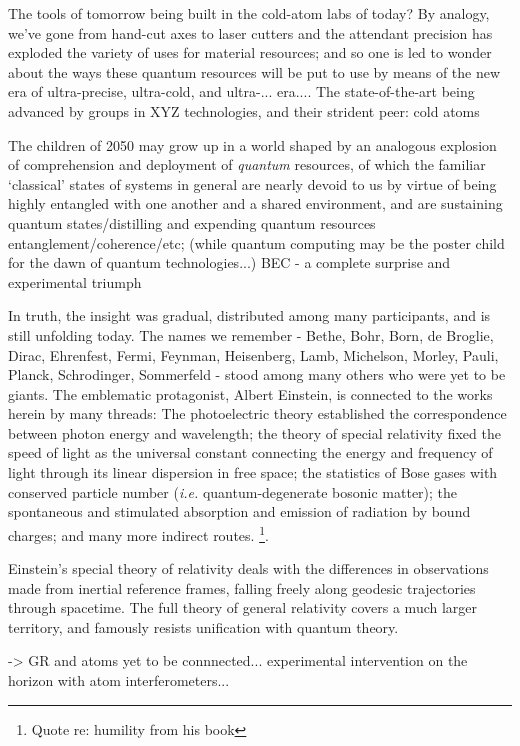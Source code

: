 The tools of tomorrow being built in the cold-atom labs of today? By analogy, we've gone from hand-cut axes to laser cutters and the attendant precision has exploded the variety of uses for material resources; and so one is led to wonder about the ways these quantum resources will be put to use by means of the new era of ultra-precise, ultra-cold, and ultra-... era.... The state-of-the-art being advanced by groups in XYZ technologies, and their strident peer: cold atoms
	
	The children of 2050 may grow up in a world shaped by an analogous explosion of comprehension and deployment of \emph{quantum} resources, of which the familiar `classical' states of systems in general are nearly devoid to us by virtue of being highly entangled with one another and a shared environment, and are sustaining quantum states/distilling and expending quantum resources entanglement/coherence/etc; (while quantum computing may be the poster child for the dawn of quantum technologies...)
	BEC - a complete surprise and experimental triumph

	In truth, the insight was gradual, distributed among many participants, and is still unfolding today. The names we remember - Bethe, Bohr, Born, de Broglie, Dirac, Ehrenfest, Fermi, Feynman, Heisenberg, Lamb, Michelson, Morley, Pauli, Planck, Schrodinger, Sommerfeld - stood among many others who were yet to be giants. The emblematic protagonist, Albert Einstein, is connected to the works herein by many threads: The photoelectric theory established the correspondence between photon energy and wavelength; the theory of special relativity fixed the speed of light as the universal constant connecting the energy and frequency of light through its linear dispersion in free space; the statistics of Bose gases with conserved particle number (\emph{i.e.} quantum-degenerate bosonic matter); the spontaneous and stimulated absorption and emission of radiation by bound charges; and many more indirect routes. \footnote{Quote re: humility from his book}.

	Einstein's special theory of relativity deals with the differences in observations made from inertial reference frames, falling freely along geodesic trajectories through spacetime. The full theory of general relativity covers a much larger territory, and famously resists unification with quantum theory. 

	-> GR and atoms yet to be connnected... experimental intervention on the horizon with atom interferometers...

